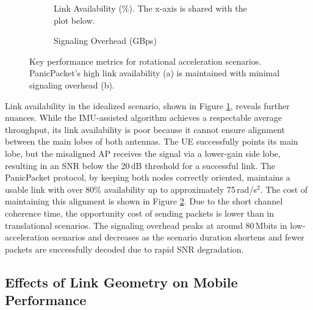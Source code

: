 \documentclass[fleqn,10pt]{wlscirep}
\begin{document}
\begin{figure}[ht!]
    \centering
    \begin{subfigure}{0.97\linewidth}
        \centering
        \caption{Link Availability (\%). The x-axis is shared with the plot below.}
        \vspace{-10pt}
        \label{fig:rot_metrics_availability}
        
    \end{subfigure}%
    \vspace{-7.6ex}
    \begin{subfigure}{0.97\linewidth}
        \centering
        
        \vspace{-25 pt}
        \caption{Signaling Overhead (GBps)}
        \label{fig:rot_metrics_overhead}
    \end{subfigure}
    \caption{Key performance metrics for rotational acceleration scenarios. PanicPacket's high link availability (a) is maintained with minimal signaling overhead (b).}
    \label{fig:rotational_metrics}
\end{figure}

Link availability in the idealized scenario, shown in Figure \ref{fig:rot_metrics_availability}, reveals further nuances. While the IMU-assisted algorithm achieves a respectable average throughput, its link availability is poor because it cannot ensure alignment between the main lobes of both antennas. The UE successfully points its main lobe, but the misaligned AP receives the signal via a lower-gain side lobe, resulting in an SNR below the 20\,dB threshold for a successful link. The PanicPacket protocol, by keeping both nodes correctly oriented, maintains a usable link with over 80\% availability up to approximately 75\,rad/s$^2$. The cost of maintaining this alignment is shown in Figure \ref{fig:rot_metrics_overhead}. Due to the short channel coherence time, the opportunity cost of sending packets is lower than in translational scenarios. The signaling overhead peaks at around 80\,Mbits in low-acceleration scenarios and decreases as the scenario duration shortens and fewer packets are successfully decoded due to rapid SNR degradation.

\subsection*{Effects of Link Geometry on Mobile Performance}
\end{document}
